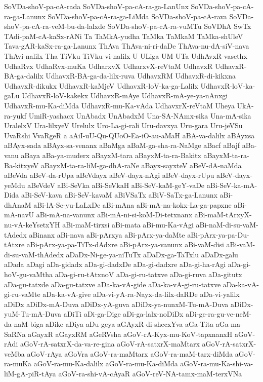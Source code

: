 {SoVDa-shoV-pa-cA-rada
SoVDa-shoV-pa-cA-ra-ga-LanUnx
SoVDa-shoV-pa-cA-ra-ga-Lanunx
SoVDa-shoV-pa-cA-ra-ga-LiMda
SoVDa-shoV-pa-cA-rava
SoVDa-shoV-pa-cA-ra-veM-bu-da-lalxde
SoVDa-shoV-pa-cA-ra-vuMTu
SoVDhA
SwTx
TAdi-paM-cA-kaSx-rANi
Ta
TaMkA-yudha
TaMka
TaMkaM
TaMka-shUleV
Tava-gAR-kaSx-ra-ga-Lanunx
ThAva
ThAva-ni-ri-daDe
ThAva-nu-dA-siV-nava
ThAvi-nalilx
Tha
TiVku
TiVku-vi-nalilx
U
ULiga
UM
UTa
UdhAvxR-vasethx
UdhaRvx
UdhaRvx-muKa
UdharxvX
UdharxvX-reVtaM
UdhavxR
UdhavxR-BA-ga-dalilx
UdhavxR-BA-ga-da-lilx-ruva
UdhavxRM
UdhavxR-di-kikxna
UdhavxR-dikukx
UdhavxR-kaMjeV
UdhavxR-loV-ka-ga-Lalilx
UdhavxR-loV-ka-gaLu
UdhavxR-loV-kakekx
UdhavxR-mAye
UdhavxR-mA-ye-ya-nAnxgi
UdhavxR-mu-Ka-diMda
UdhavxR-mu-Ka-vAda
UdhavxrX-reVtaM
Uheya
UkA-ra-yukf
UmiR-yashacx
UnAbadx
UnAbadxM
Una-SA-NAmx-sika
Una-mA-sika
UralelxV
Ura-lilxyeV
Urelulx
Uro-La-gi-rali
Uru-davxya
Uru-gara
Uru-jeVSu
UvaRshi
VvaRgeR
a
aAiI-uU-Qu-QUoO-Ea-iO-au-aMaH
aBA-va-dalilx
aBAyxsa
aBAyx-sada
aBAyx-sa-venanx
aBaMga
aBaM-ga-sha-ra-NaMge
aBacf
aBajf
aBa-vanu
aBaya
aBa-ya-muderx
aBayxM-tara
aBayxM-ta-ra-Bakitx
aBayxM-ta-ra-Ba-kitxyeV
aBayxM-ta-ra-liM-ga-dhA-raNe
aBayx-sayxteV
aBeV-dA-naMda
aBeVda
aBeV-da-rUpa
aBeVdayx
aBeV-dayx-nAgi
aBeV-dayx-rUpu
aBeV-dayx-yeMdu
aBeVdeV
aBi-SeVka
aBi-SeVkaH
aBi-SeV-kaM-geY-vaDe
aBi-SeV-ka-mA-Dida
aBi-SeV-kava
aBi-SeV-kavaM
aBiVSaTx
aBiV-SaTx-ga-Lanunx
aBi-dhAnaM
aBi-lA-Se-yu-LaLxDe
aBi-mAna
aBi-mA-na-kokx-La-ga-papxne
aBi-mA-navU
aBi-mA-na-vanunx
aBi-mA-ni-si-koM-Di-tetxnanx
aBi-maM-tArxyX-nu-vA-keYsetxYH
aBi-maM-tirxsi
aBi-mata
aBi-mu-Ka-vAgi
aBi-naM-di-su-vaM-tAdedx
aBinanx
aBi-nava
aBi-pArxya
aBi-pArx-ya-daMte
aBi-pArx-ya-pa-Du-tAtxre
aBi-pArx-ya-pa-TiTx-dAdxre
aBi-pArx-ya-vanunx
aBi-vaM-disi
aBi-vaM-di-su-vaM-thAdedx
aDaDx-Ni-ge-ya-niTuTx
aDaDx-ga-TaTxlu
aDaDx-galu
aDada
aDagi
aDa-gidadx
aDa-gi-dadxDe
aDa-gi-dadxre
aDa-gi-ha-rAgi
aDa-gi-hoV-gu-vaMtha
aDa-gi-ru-tAtxnoV
aDa-gi-ru-tatxve
aDa-gi-ruva
aDa-gitutx
aDa-gu-tatxde
aDa-gu-tatxve
aDa-ka-vA-gide
aDa-ka-vA-gi-ru-tatxve
aDa-ka-vA-gi-ru-vaMte
aDa-ka-vA-give
aDa-vi-yA-ra-Nayx-da-lilx-daRDe
aDa-vi-yalilx
aDiDx
aDiDx-mA-Duva
aDiDx-yA-guva
aDiDx-ya-nunxM-Tu-mA-Duva
aDiDx-yuM-Tu-mA-Duva
aDiTi
aDi-ga-Dige
aDi-ga-lalx-noDiDx
aDi-ge-ra-gu-ve-neM-da-naM-biga
aDike
aDiya
aDu-geya
aGAyxR-di-shecxYva
aGa-Tita
aGa-ma-SaRNa
aGayxR
aGayxRM
aGeRVsha
aGoV-rA-Kyx-mu-KoV-tapxnanxH
aGoV-rAdi
aGoV-rA-satxrX-da-va-re-gina
aGoV-rA-satxrX-maMtarx
aGoV-rA-satxrX-veMba
aGoV-rAya
aGoVra
aGoV-ra-maMtarx
aGoV-ra-maM-tarx-diMda
aGoV-ra-muKa
aGoV-ra-mu-Ka-dalilx
aGoV-ra-mu-Ka-diMda
aGoV-ra-mu-Ka-shi-va-liM-gA-piR-tAya
aGoV-ra-shi-vA-cAyaR
aGoV-reV-NA-tamx-maM-terxVNa
}
